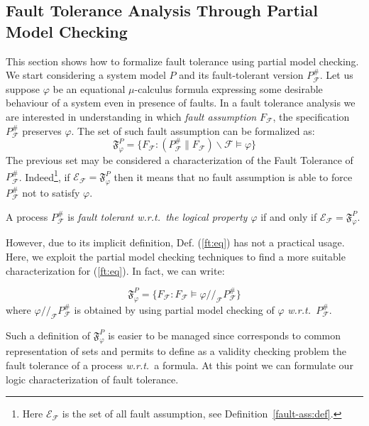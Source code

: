 \documentclass{entcs}
\newcommand{\wrt}{\emph{w.r.t.~}}
\newcommand{\quotres}[2]{\slash\!\!\slash_{#1} #2}
\newcommand{\Faults}{\mathcal{F}}
\newcommand{\faulttolerant}[1]{{#1}^{\#}_\Faults}
\newcommand{\env}[1]{\mathcal{E}_{#1}}
\newcommand{\faultenv}{\env{\Faults}}
\newcommand{\faultscenarios}{\faultenv}
\newcommand{\faultscenario}[1]{\mathfrak{#1}}
\newcommand{\res}{\backslash}
\newcommand{\sat}{\models}
\begin{document}
\subsection{Fault Tolerance Analysis Through Partial Model Checking}
This section shows how to formalize fault tolerance using partial
model checking.  We start considering a system model $P$ and its
fault-tolerant version $P^\#_\Faults$.  Let us suppose $\varphi$ be an
equational $\mu$-calculus formula expressing some desirable behaviour of a
system even in presence of faults. In a fault tolerance analysis we are
interested in understanding in which \emph{fault assumption}
$F_{\Faults}$, the specification $P^\#_\Faults$ preserves $\varphi$. The
set of such fault assumption can be formalized as:
%
\begin{equation}
\label{ft:eq}
\faultscenario{F}_\varphi^P = \{F_\Faults: (\faulttolerant{P}
\parallel F_\Faults) \res \Faults \sat \varphi \}
\end{equation}
%
The previous set may be considered a characterization of the Fault Tolerance
of $\faulttolerant{P}$.
Indeed\footnote{Here $\faultscenarios$ is the set
of all fault assumption, see Definition~\ref{fault-ass:def}.},
if $\faultscenarios = \faultscenario{F}_\varphi^P$
then it means that no fault assumption is able to force
$\faulttolerant{P}$ not to satisfy $\varphi$.%

\begin{definition}
  A process $\faulttolerant{P}$ is \emph{fault tolerant \wrt the logical
    property $\varphi$} if and only if $\faultscenarios =
  \faultscenario{F}_\varphi^P$.
\label{ftcar}
\end{definition}%

However, due to its implicit definition, Def. (\ref{ft:eq}) has not a
practical usage.  Here, we exploit the partial model checking
techniques to find a more suitable characterization for
(\ref{ft:eq}). In fact, we can write: %

\begin{equation}
\label{ftpmc:eq}
\faultscenario{F}_\varphi^P =
\{F_\Faults: F_\Faults \sat \varphi \quotres{\Faults}{\faulttolerant{P}} \}
\end{equation}%
where $\varphi \quotres{\Faults}{\faulttolerant{P}}$ is obtained by using partial
model checking of $\varphi$ \wrt $\faulttolerant{P}$.

Such a definition of $\faultscenario{F}_\varphi^P$ is easier to be
managed since corresponds to common representation of sets and permits
to define as a validity checking problem the fault tolerance of a
process \wrt a formula. At this point we can formulate our logic
characterization of fault tolerance.%
\end{document}
